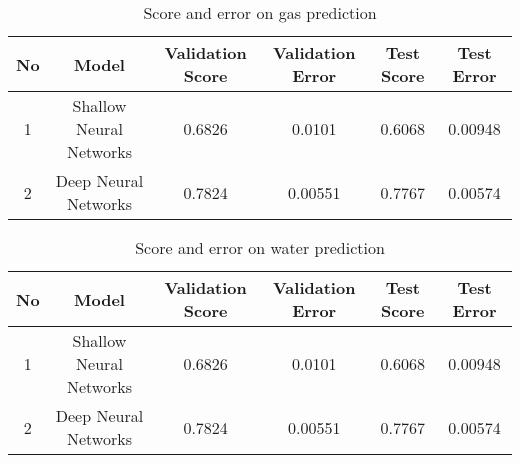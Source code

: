 \documentclass[english]{article}
\begin{document}
\begin{table}[H]
\caption{Score and error on gas prediction}
\begin{tabular}{|c|c|c|c|c|c|}
\hline
\textbf{No} & \textbf{Model}          & \textbf{Validation Score} & \textbf{Validation Error} & \textbf{Test Score} & \textbf{Test Error} \\ \hline
1           & Shallow Neural Networks & 0.6826                    & 0.0101                    & 0.6068              & 0.00948             \\ \hline
2           & Deep Neural Networks    & 0.7824                    & 0.00551                   & 0.7767              & 0.00574             \\ \hline
\end{tabular}
\end{table}


\begin{table}[H]
\caption{Score and error on water prediction}
\begin{tabular}{|c|c|c|c|c|c|}
\hline
\textbf{No} & \textbf{Model}          & \textbf{Validation Score} & \textbf{Validation Error} & \textbf{Test Score} & \textbf{Test Error} \\ \hline
1           & Shallow Neural Networks & 0.6826                    & 0.0101                    & 0.6068              & 0.00948             \\ \hline
2           & Deep Neural Networks    & 0.7824                    & 0.00551                   & 0.7767              & 0.00574             \\ \hline
\end{tabular}
\end{table}
\end{document}
